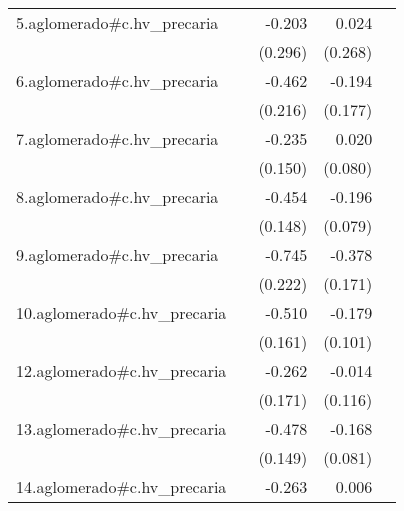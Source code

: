 {\begin{longtable}{l*{4}{D{.}{.}{-1}}}
\addlinespace
5.aglomerado#c.hv\_precaria&                     &      -0.203         &       0.024         &                     \\
            &                     &     (0.296)         &     (0.268)         &                     \\
\addlinespace
6.aglomerado#c.hv\_precaria&                     &      -0.462\sym{*}  &      -0.194         &                     \\
            &                     &     (0.216)         &     (0.177)         &                     \\
\addlinespace
7.aglomerado#c.hv\_precaria&                     &      -0.235         &       0.020         &                     \\
            &                     &     (0.150)         &     (0.080)         &                     \\
\addlinespace
8.aglomerado#c.hv\_precaria&                     &      -0.454\sym{**} &      -0.196\sym{*}  &                     \\
            &                     &     (0.148)         &     (0.079)         &                     \\
\addlinespace
9.aglomerado#c.hv\_precaria&                     &      -0.745\sym{***}&      -0.378\sym{*}  &                     \\
            &                     &     (0.222)         &     (0.171)         &                     \\
\addlinespace
10.aglomerado#c.hv\_precaria&                     &      -0.510\sym{**} &      -0.179         &                     \\
            &                     &     (0.161)         &     (0.101)         &                     \\
\addlinespace
12.aglomerado#c.hv\_precaria&                     &      -0.262         &      -0.014         &                     \\
            &                     &     (0.171)         &     (0.116)         &                     \\
\addlinespace
13.aglomerado#c.hv\_precaria&                     &      -0.478\sym{**} &      -0.168\sym{*}  &                     \\
            &                     &     (0.149)         &     (0.081)         &                     \\
\addlinespace
14.aglomerado#c.hv\_precaria&                     &      -0.263         &       0.006         &                     \\

\end{longtable}}
